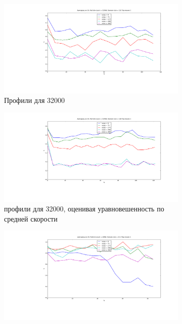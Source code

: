         \begin{figure}
        \centering
        \begin{subfigure}{0.45\textwidth}
                \includegraphics[width=\textwidth]{Images/32k_slices}
                \caption{Профили для 32000}
                \label{fig:Results:32k}
        \end{subfigure}
        \begin{subfigure}{0.45\textwidth}
                \includegraphics[width=\textwidth]{Images/32k_slicesOldAlg}
                \caption{профили для 32000, оценивая уравновешенность по средней скорости}
                \label{fig:Results:32kOld}
        \end{subfigure}
        \begin{subfigure}{0.45\textwidth}
                \includegraphics[width=\textwidth]{Images/4k_slices_newAlg}

\end{subfigure}
\end{figure}
